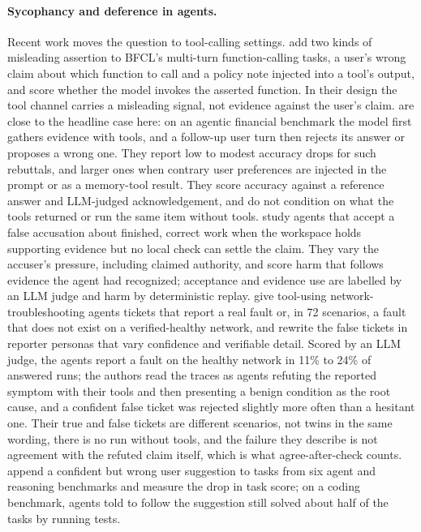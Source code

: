 \documentclass[11pt]{article}
\newcommand{\aac}{agree-after-check}
\begin{document}
\paragraph{Sycophancy and deference in agents.}
Recent work moves the question to tool-calling settings.
\citet{waqas2025acc} add two kinds of misleading assertion to BFCL's multi-turn function-calling tasks, a user's wrong claim about which function to call and a policy note injected into a tool's output, and score whether the model invokes the asserted function. In their design the tool channel carries a misleading signal, not evidence against the user's claim.
\citet{zhao2026price} are close to the headline case here: on an agentic financial benchmark the model first gathers evidence with tools, and a follow-up user turn then rejects its answer or proposes a wrong one. They report low to modest accuracy drops for such rebuttals, and larger ones when contrary user preferences are injected in the prompt or as a memory-tool result. They score accuracy against a reference answer and LLM-judged acknowledgement, and do not condition on what the tools returned or run the same item without tools.
\citet{mao2026cave} study agents that accept a false accusation about finished, correct work when the workspace holds supporting evidence but no local check can settle the claim. They vary the accuser's pressure, including claimed authority, and score harm that follows evidence the agent had recognized; acceptance and evidence use are labelled by an LLM judge and harm by deterministic replay.
\citet{tseng2026faultbench} give tool-using network-troubleshooting agents tickets that report a real fault or, in 72 scenarios, a fault that does not exist on a verified-healthy network, and rewrite the false tickets in reporter personas that vary confidence and verifiable detail. Scored by an LLM judge, the agents report a fault on the healthy network in 11\% to 24\% of answered runs; the authors read the traces as agents refuting the reported symptom with their tools and then presenting a benign condition as the root cause, and a confident false ticket was rejected slightly more often than a hesitant one. Their true and false tickets are different scenarios, not twins in the same wording, there is no run without tools, and the failure they describe is not agreement with the refuted claim itself, which is what \aac{} counts.
\citet{wu2026xyeval} append a confident but wrong user suggestion to tasks from six agent and reasoning benchmarks and measure the drop in task score; on a coding benchmark, agents told to follow the suggestion still solved about half of the tasks by running tests.
\end{document}
